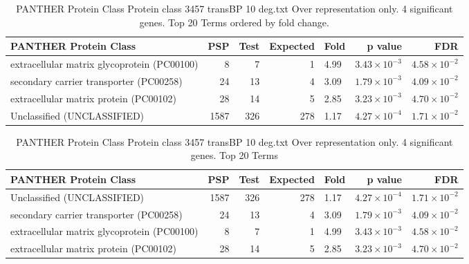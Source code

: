 \begin{table}[ht]
\centering
\begin{adjustbox}{width=\textwidth}
\begin{tabular}{lrrrlrr}
  \hline
PANTHER Protein Class & PSP  & Test  & Expected & Fold & p value & FDR \\ 
  \hline
extracellular matrix glycoprotein (PC00100) & 8 & 7 & 1 & 4.99 & $3.43 \times 10^{-3}$ & $4.58 \times 10^{-2}$ \\ 
  secondary carrier transporter (PC00258) & 24 & 13 & 4 & 3.09 & $1.79 \times 10^{-3}$ & $4.09 \times 10^{-2}$ \\ 
  extracellular matrix protein (PC00102) & 28 & 14 & 5 & 2.85 & $3.23 \times 10^{-3}$ & $4.70 \times 10^{-2}$ \\ 
  Unclassified (UNCLASSIFIED) & 1587 & 326 & 278 & 1.17 & $4.27 \times 10^{-4}$ & $1.71 \times 10^{-2}$ \\ 
   \hline
\end{tabular}
\end{adjustbox}
\caption{PANTHER Protein Class Protein class 3457 transBP 10 deg.txt Over representation only. 4 significant genes. Top 20 Terms ordered by fold change. } 
\label{tab:PANTHER Protein Class Protein class 3457 transBP 10 deg.txt Over representation only. 4 significant genes. Top 20 Terms ordered by fold change. }
\end{table}




\begin{table}[ht]
\centering
\begin{adjustbox}{width=\textwidth}
\begin{tabular}{lrrrlrr}
  \hline
PANTHER Protein Class & PSP  & Test  & Expected & Fold & p value & FDR \\ 
  \hline
Unclassified (UNCLASSIFIED) & 1587 & 326 & 278 & 1.17 & $4.27 \times 10^{-4}$ & $1.71 \times 10^{-2}$ \\ 
  secondary carrier transporter (PC00258) & 24 & 13 & 4 & 3.09 & $1.79 \times 10^{-3}$ & $4.09 \times 10^{-2}$ \\ 
  extracellular matrix glycoprotein (PC00100) & 8 & 7 & 1 & 4.99 & $3.43 \times 10^{-3}$ & $4.58 \times 10^{-2}$ \\ 
  extracellular matrix protein (PC00102) & 28 & 14 & 5 & 2.85 & $3.23 \times 10^{-3}$ & $4.70 \times 10^{-2}$ \\ 
   \hline
\end{tabular}
\end{adjustbox}
\caption{PANTHER Protein Class Protein class 3457 transBP 10 deg.txt Over representation only. 4 significant genes. Top 20 Terms} 
\label{tab:PANTHER Protein Class Protein class 3457 transBP 10 deg.txt Over representation only. 4 significant genes. Top 20 Terms}
\end{table}





